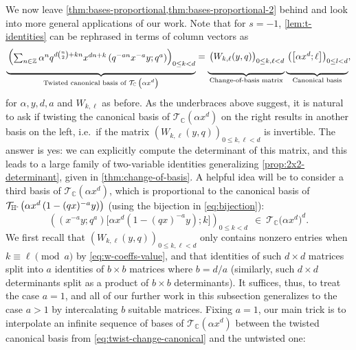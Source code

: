 \documentclass[reqno,11pt]{amsart}
\theoremstyle{definition}
\theoremstyle{remark}
\numberwithin{equation}{section}
\newcommand{\Z}{\mathbb{Z}}
\newcommand{\C}{\mathbb{C}}
\newcommand{\Hminus}{{\mathbb{H}^{\textnormal{-}\hspace{-0.03cm}}}}
\newcommand{\mT}{\mathcal{T}}
\newcommand{\vect}[2]{\big[{#1};{#2}\big]}
\newcommand{\fix}[1]{\textcolor{blue}{\large (#1)\normalsize}}
\begin{document}
We now leave \cref{thm:bases-proportional,thm:bases-proportional-2} behind and look into more general applications of our work. Note that for $s = -1$, \cref{lem:t-identities} can be rephrased in terms of column vectors as
\begin{equation} \label{eq:twist-change-canonical}
    \underbrace{\vphantom{\sum_n} 
    \begin{pmatrix}
    \sum_{n \in \Z} \alpha^n q^{d\binom{n}{2}+kn} x^{dn+k} \left(q^{-an} x^{-a} y; q^a\right)
    \end{pmatrix}_{0 \le k < d}
    }_{\text{Twisted canonical basis of $\mT_\C\left(\alpha x^d\right)$}} 
    =
    \underbrace{\vphantom{\sum_n} 
    \begin{pmatrix}
    W_{k,\ell}(y, q)
    \end{pmatrix}_{0 \le k, \ell < d}
    }_{\text{Change-of-basis matrix}}
    \underbrace{\vphantom{\sum_n}
    \begin{pmatrix}
    \vect{\alpha x^d}{\ell}
    \end{pmatrix}_{0 \le l < d}
    }_{\text{Canonical basis}},
\end{equation}
for $\alpha, y, d, a$ and $W_{k,\ell}$ as before. As the underbraces above suggest, it is natural to ask if twisting the canonical basis of $\mT_\C(\alpha x^d)$ on the right results in another basis on the left, i.e.\ if the matrix $\left(
    W_{k,\ell}(y, q)
    \right)_{0 \le k, \ell < d}$ 
is invertible. The answer is yes: we can explicitly compute the determinant of this matrix, and this leads to a large family of two-variable identities generalizing \cref{prop:2x2-determinant}, given in \cref{thm:change-of-basis}. A helpful idea will be to consider a third basis of $\mT_\C\left(\alpha x^d\right)$, which is proportional to the canonical basis of $\mT_\Hminus\left(\alpha x^d\left(1 - (qx)^{-a}y\right)\right)$ (using the bijection in \cref{eq:bijection}): 
\[
    \left(\left(x^{-a} y; q^a\right) \vect{\alpha x^d\left(1 - (qx)^{-a}y\right)}{k} \right)_{0 \le k < d} 
    \ \ \in\ 
    \mT_\C\big(\alpha x^d\big)^d.
\]
We first recall that $\left(W_{k,\ell}(y, q)\right)_{0 \le k, \ell < d}$ only contains nonzero entries when $k \equiv \ell \pmod{a}$ by \cref{eq:w-coeffs-value}, and that identities of such $d\times d$ matrices split into $a$ identities of $b \times b$ matrices where $b = d/a$ (similarly, such $d \times d$ determinants split as a product of $b \times b$ determinants). It suffices, thus, to treat the case $a = 1$, and all of our further work in this subsection generalizes to the case $a > 1$ by intercalating $b$ suitable matrices. Fixing $a = 1$, our main trick is to interpolate an infinite sequence of bases of $\mT_\C\left(\alpha x^d\right)$ between the twisted canonical basis from \cref{eq:twist-change-canonical} and the untwisted one:
\end{document}
